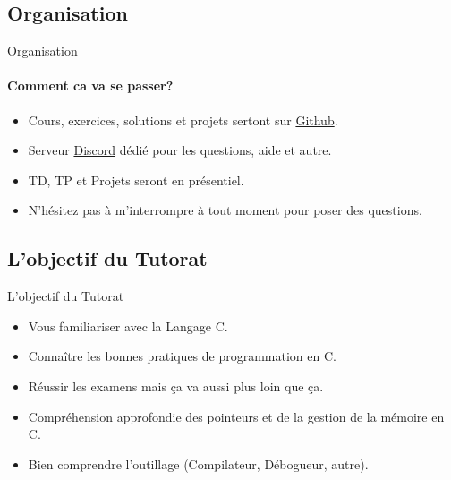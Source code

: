 \documentclass{beamer}
\begin{document}
\begin{darkframes}
  	\subsection{Organisation}
  	\begin{frame}{Organisation}
  		\framesubtitle{Comment ca va se passer?}%
  		\begin{itemize}
  			\item Cours, exercices, solutions et projets sertont sur \href{https://github.com/Darhal/TeachingC}{Github}.
  			\item Serveur \href{https://discord.gg/y9nYQ5A5Fz}{Discord} dédié pour les questions, aide et autre.
  			\item TD, TP et Projets seront en présentiel.
  			\item N'hésitez pas à m'interrompre à tout moment pour poser des questions.
  		\end{itemize}
  	\end{frame}
  	\subsection{L'objectif du Tutorat}
  	
  	\begin{frame}{L'objectif du Tutorat}
  		\begin{itemize}
	  		\item Vous familiariser avec la Langage C.
	  		\item Connaître les bonnes pratiques de programmation en C.
	  		\item Réussir les examens mais ça va aussi plus loin que ça.
	  		\item Compréhension approfondie des pointeurs et de la gestion de la mémoire en C.
	  		\item Bien comprendre l'outillage (Compilateur, Débogueur, autre).
  		\end{itemize}
    \end{frame}


\end{darkframes}
\end{document}

